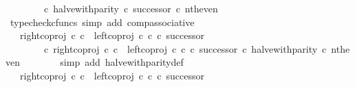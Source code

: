 \begin{isabellebody}
\ \ \ \ \ \ \ \ {\isasymcirc}\isactrlsub c\ {\isacharparenleft}{\kern0pt}halve{\isacharunderscore}{\kern0pt}with{\isacharunderscore}{\kern0pt}parity\ {\isasymcirc}\isactrlsub c\ successor{\isacharparenright}{\kern0pt}\ {\isasymcirc}\isactrlsub c\ nth{\isacharunderscore}{\kern0pt}even{\isachardoublequoteclose}\isanewline
\ \ \ \ \ \ \isamarkupfalse%
\ {\isacharparenleft}{\kern0pt}typecheck{\isacharunderscore}{\kern0pt}cfuncs{\isacharcomma}{\kern0pt}\ simp\ add{\isacharcolon}{\kern0pt}\ comp{\isacharunderscore}{\kern0pt}associative{}{\isacharparenright}{\kern0pt}\isanewline
\ \ \ \ \isamarkupfalse%
\ \isamarkupfalse%
\ {\isachardoublequoteopen}{\isachardot}{\kern0pt}{\isachardot}{\kern0pt}{\isachardot}{\kern0pt}\ {\isacharequal}{\kern0pt}\ {\isacharparenleft}{\kern0pt}right{\isacharunderscore}{\kern0pt}coproj\ {\isasymnat}\isactrlsub c\ {\isasymnat}\isactrlsub c\ {\isasymamalg}\ {\isacharparenleft}{\kern0pt}left{\isacharunderscore}{\kern0pt}coproj\ {\isasymnat}\isactrlsub c\ {\isasymnat}\isactrlsub c\ {\isasymcirc}\isactrlsub c\ successor{\isacharparenright}{\kern0pt}{\isacharparenright}{\kern0pt}\isanewline
\ \ \ \ \ \ \ \ {\isasymcirc}\isactrlsub c\ {\isacharparenleft}{\kern0pt}{\isacharparenleft}{\kern0pt}right{\isacharunderscore}{\kern0pt}coproj\ {\isasymnat}\isactrlsub c\ {\isasymnat}\isactrlsub c\ {\isasymamalg}\ {\isacharparenleft}{\kern0pt}left{\isacharunderscore}{\kern0pt}coproj\ {\isasymnat}\isactrlsub c\ {\isasymnat}\isactrlsub c\ {\isasymcirc}\isactrlsub c\ successor{\isacharparenright}{\kern0pt}{\isacharparenright}{\kern0pt}\ {\isasymcirc}\isactrlsub c\ halve{\isacharunderscore}{\kern0pt}with{\isacharunderscore}{\kern0pt}parity{\isacharparenright}{\kern0pt}\ {\isasymcirc}\isactrlsub c\ nth{\isacharunderscore}{\kern0pt}even{\isachardoublequoteclose}\isanewline
\ \ \ \ \ \ \isamarkupfalse%
\ {\isacharparenleft}{\kern0pt}simp\ add{\isacharcolon}{\kern0pt}\ halve{\isacharunderscore}{\kern0pt}with{\isacharunderscore}{\kern0pt}parity{\isacharunderscore}{\kern0pt}def{}{\isacharparenright}{\kern0pt}\isanewline
\ \ \ \ \isamarkupfalse%
\ \isamarkupfalse%
\ {\isachardoublequoteopen}{\isachardot}{\kern0pt}{\isachardot}{\kern0pt}{\isachardot}{\kern0pt}\ {\isacharequal}{\kern0pt}\ {\isacharparenleft}{\kern0pt}{\isacharparenleft}{\kern0pt}right{\isacharunderscore}{\kern0pt}coproj\ {\isasymnat}\isactrlsub c\ {\isasymnat}\isactrlsub c\ {\isasymamalg}\ {\isacharparenleft}{\kern0pt}left{\isacharunderscore}{\kern0pt}coproj\ {\isasymnat}\isactrlsub c\ {\isasymnat}\isactrlsub c\ {\isasymcirc}\isactrlsub c\ successor{\isacharparenright}{\kern0pt}{\isacharparenright}{\kern0pt}\isanewline

\end{isabellebody}

